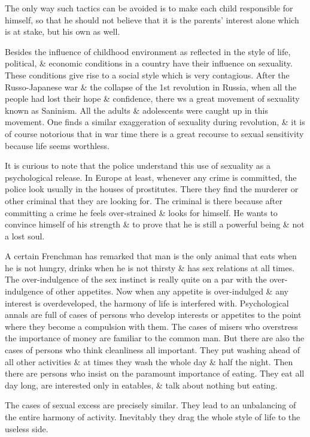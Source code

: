 \documentclass{article}
\begin{document}
The only way such tactics can be avoided is to make each child responsible for himself, so that he should not believe that it is the parents' interest alone which is at stake, but his own as well.

Besides the influence of childhood environment as reflected in the style of life, political, \& economic conditions in a country have their influence on sexuality. These conditions give rise to a social style which is very contagious.  After the Russo-Japanese war \& the collapse of the 1st revolution in Russia, when all the people had lost their hope \& confidence, there ws a great movement of sexuality known as Saninism. All the adults \& adolescents were caught up in this movement. One finds a similar exaggeration of sexuality during revolution, \& it is of course notorious that in war time there is a great recourse to sexual sensitivity because life seems worthless.

It is curious to note that the police understand this use of sexuality as a psychological release. In Europe at least, whenever any crime is committed, the police look usually in the houses of prostitutes. There they find the murderer or other criminal that they are looking for. The criminal is there because after committing a crime he feels over-strained \& looks for himself. He wants to convince himself of his strength \& to prove that he is still a powerful being \& not a lost soul.

A certain Frenchman has remarked that man is the only animal that eats when he is not hungry, drinks when he is not thirsty \& has sex relations at all times. The over-indulgence of the sex instinct is really quite on a par with the over-indulgence of other appetites. Now when any appetite is over-indulged \& any interest is overdeveloped, the harmony of life is interfered with. Psychological annals are full of cases of persons who develop interests or appetites to the point where they become a compulsion with them. The cases of misers who overstress the importance of money are familiar to the common man. But there are also the cases of persons who think cleanliness all important. They put washing ahead of all other activities \& at times they wash the whole day \& half the night. Then there are persons who insist on the paramount importance of eating. They eat all day long, are interested only in eatables, \& talk about nothing but eating.

The cases of sexual excess are precisely similar. They lead to an unbalancing of the entire harmony of activity. Inevitably they drag the whole style of life to the useless side.
\end{document}
